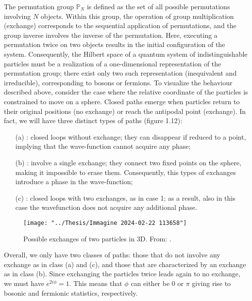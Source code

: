 \documentclass{Configuration_Files/PoliMi3i_thesis}
\begin{document}
The permutation group $\mathbb{P}_N$ is defined as the set of all possible permutations involving $N$ objects. Within this group, the operation of group multiplication (exchange) corresponds to the sequential application of permutations, and the group inverse involves the inverse of the permutation. Here, executing a permutation twice on two objects results in the initial configuration of the system.
Consequently, the Hilbert space of a quantum system of indistinguishable particles must be a realization of a one-dimensional representation of the permutation group; there exist only two such representation (inequivalent and irreducible), corresponding to bosons or fermions.
To visualize the behaviour described above, consider the case where the relative coordinate of the particles is constrained to move on a sphere. Closed paths emerge when particles return to their original positions (no exchange) or reach the antipodal point (exchange). In fact, we will have three distinct types of paths (figure 1.12): 

\begin{itemize}
	\item[(a)]: closed loops without exchange; they can disappear if reduced to a point, implying that the wave-function cannot acquire any phase; 
	
	\item[(b)] : involve a single exchange; they connect two fixed points on the sphere, making it impossible to erase them. Consequently, this types of exchanges introduce a phase in the wave-function;
	
	\item[(c)] : closed loops with two exchanges, as in case 1; as a result, also in this case the wavefunction does not acquire any additional phase.
\end{itemize}

\begin{figure}
	\centering
	\texttt{[image: "../Thesis/Immagine 2024-02-22 113658"]}
	\caption{{ Possible exchanges of two particles in 3D. From: \cite{Rao16}.}}
	\label{fig:immagine-2024-02-22-113658}
\end{figure}

Overall, we only have two classes of paths: those that do not involve any exchange as in class (a) and (c), and those that are characterized by an exchange as in class (b). 
Since exchanging the particles twice leads again to no exchange, we must have $e^{2i \phi} = 1$. This means that $\phi$ can either be 0 or $\pi$ giving rise to bosonic and fermionic statistics, respectively. 
\end{document}
